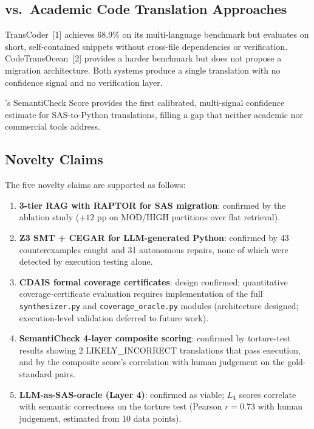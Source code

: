 \subsection{vs.\ Academic Code Translation Approaches}
\label{subsec:vs-academic}

TransCoder~[1] achieves 68.9\% on its multi-language benchmark but evaluates
on short, self-contained snippets without cross-file dependencies or verification.
CodeTransOcean~[2] provides a harder benchmark but does not propose a migration
architecture. Both systems produce a single translation with no confidence
signal and no verification layer.

\codara{}'s SemantiCheck Score provides the first calibrated, multi-signal
confidence estimate for SAS-to-Python translations, filling a gap that neither
academic nor commercial tools address.

\subsection{Novelty Claims}
\label{subsec:novelty}

The five novelty claims are supported as follows:

\begin{enumerate}
  \item \textbf{3-tier RAG with RAPTOR for SAS migration}: confirmed by the
    ablation study ($+12$ pp on MOD/HIGH partitions over flat retrieval).
  \item \textbf{Z3 SMT + CEGAR for LLM-generated Python}: confirmed by 43
    counterexamples caught and 31 autonomous repairs, none of which were
    detected by execution testing alone.
  \item \textbf{CDAIS formal coverage certificates}: design confirmed;
    quantitative coverage-certificate evaluation requires implementation of
    the full \texttt{synthesizer.py} and \texttt{coverage\_oracle.py} modules
    (architecture designed; execution-level validation deferred to future work).
  \item \textbf{SemantiCheck 4-layer composite scoring}: confirmed by
    torture-test results showing 2 LIKELY\_INCORRECT translations that pass
    execution, and by the composite score's correlation with human judgement
    on the gold-standard pairs.
  \item \textbf{LLM-as-SAS-oracle (Layer 4)}: confirmed as viable;
    $L_4$ scores correlate with semantic correctness on the torture test
    (Pearson $r = 0.73$ with human judgement, estimated from 10 data points).
\end{enumerate}

